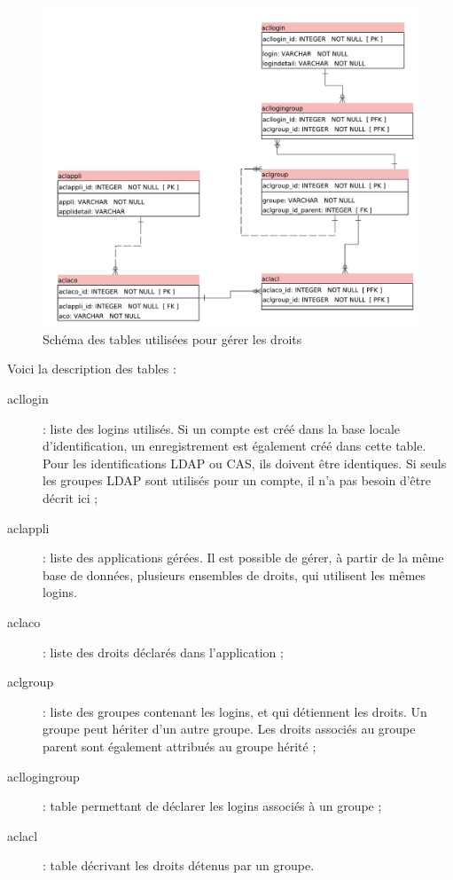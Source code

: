 \begin{figure}[H]
\includegraphics[width=\linewidth]{images/acl_only}
\caption{Schéma des tables utilisées pour gérer les droits}
\end{figure}

Voici la description des tables :
\begin{description}
\item[acllogin] : liste des logins utilisés. Si un compte est créé dans la base locale d'identification, un enregistrement est également créé dans cette table. Pour les identifications LDAP ou CAS, ils doivent être identiques. Si seuls les groupes LDAP sont utilisés pour un compte, il n'a pas besoin d'être décrit ici ;
\item[aclappli] : liste des applications gérées. Il est possible de gérer, à partir de la même base de données, plusieurs ensembles de droits, qui utilisent les mêmes logins.
\item[aclaco] : liste des droits déclarés dans l'application ;
\item[aclgroup] : liste des groupes contenant les logins, et qui détiennent les droits. Un groupe peut hériter d'un autre groupe. Les droits associés au groupe parent sont également attribués au groupe hérité ;
\item[acllogingroup] : table permettant de déclarer les logins associés à un groupe ;
\item[aclacl] : table décrivant les droits détenus par un groupe.
\end{description}


